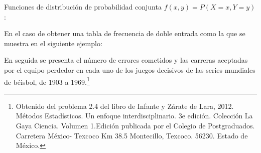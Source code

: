 Funciones de distribución de probabilidad conjunta $f\left( x,y\right) =P\left( X=x,Y=y\right)$:

En el caso de obtener una tabla de frecuencia de doble entrada como la que se muestra en el siguiente ejemplo:

\begin{example}
    En seguida se presenta el número de errores cometidos y las carreras aceptadas por el equipo perdedor en cada uno de los juegos decisivos de las series mundiales de béisbol, de 1903 a 1969.\footnote{Obtenido del problema 2.4 del libro de Infante y Zárate de Lara, 2012. Métodos Estadísticos. Un enfoque interdisciplinario. 3e edición. Colección La Gaya Ciencia. Volumen 1.Edición publicada por el Colegio de Postgraduados. Carretera México- Texcoco Km 38.5 Montecillo, Texcoco. 56230. Estado de México.}
\end{example}

